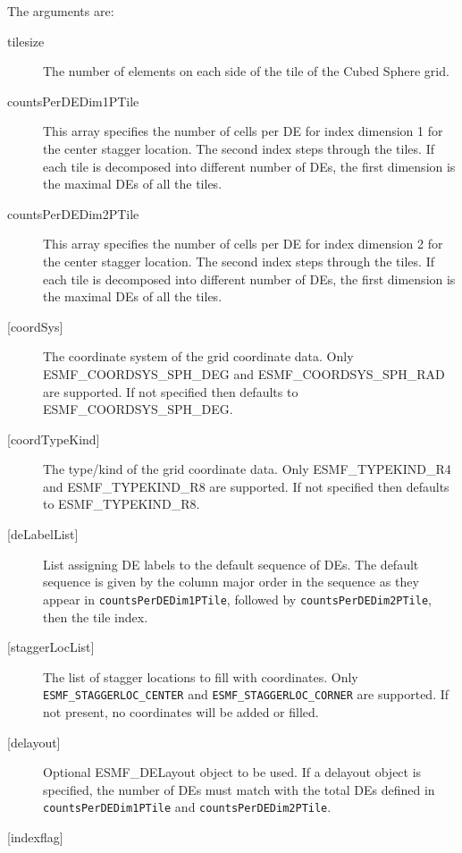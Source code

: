        The arguments are:
       \begin{description}
       \item[tilesize]
            The number of elements on each side of the tile of the Cubed Sphere grid.
       \item[countsPerDEDim1PTile]
            This array specifies the number of cells per DE for index dimension 1 for the
            center stagger location. The second index steps through the tiles. If each tile is 
            decomposed into different number of DEs, the first dimension is the maximal DEs of 
            all the tiles.  
       \item[countsPerDEDim2PTile]
            This array specifies the number of cells per DE for index dimension 2 for the
            center stagger location. The second index steps through the tiles. If each tile is 
            decomposed into different number of DEs, the first dimension is the maximal DEs of 
            all the tiles.  
       \item[{[coordSys]}]
            The coordinate system of the grid coordinate data.
            Only ESMF\_COORDSYS\_SPH\_DEG and ESMF\_COORDSYS\_SPH\_RAD are supported. 
            If not specified then defaults to ESMF\_COORDSYS\_SPH\_DEG.
       \item[{[coordTypeKind]}]
            The type/kind of the grid coordinate data. Only ESMF\_TYPEKIND\_R4
            and ESMF\_TYPEKIND\_R8 are supported.
            If not specified then defaults to ESMF\_TYPEKIND\_R8.
       \item[{[deLabelList]}]
            List assigning DE labels to the default sequence of DEs. The default
            sequence is given by the column major order in the sequence as they appear
            in {\tt countsPerDEDim1PTile}, followed by {\tt countsPerDEDim2PTile}, then the 
            tile index.
       \item[{[staggerLocList]}]
            The list of stagger locations to fill with coordinates. Only {\tt ESMF\_STAGGERLOC\_CENTER}
            and {\tt ESMF\_STAGGERLOC\_CORNER} are supported.  If not present, no coordinates
            will be added or filled.
       \item[{[delayout]}]
            Optional ESMF\_DELayout object to be used. If a delayout object is specified,
            the number of DEs must match with the total DEs defined in {\tt countsPerDEDim1PTile}
            and {\tt countsPerDEDim2PTile}.
       \item[{[indexflag]}]

\end{description}
